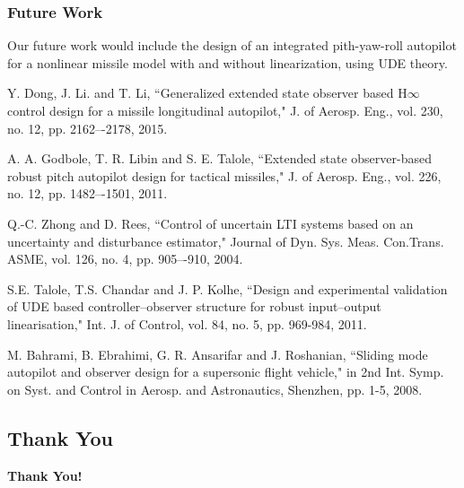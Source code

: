 \documentclass[table,10pt,red]{beamer}	%
\begin{document}
\begin{frame}
\frametitle{Future Work}
Our future work would include the design of an integrated pith-yaw-roll autopilot for a nonlinear missile model with and without linearization, using UDE theory.

\end{frame}


\begin{thebibliography}{1}

	 Y. Dong, J. Li. and T. Li, ``Generalized extended state observer based H$\infty$ control design for a missile longitudinal autopilot," J. of Aerosp. Eng., vol. 230, no. 12, pp. 2162–-2178, 2015. \label{geso}
	
	 A. A. Godbole, T. R. Libin and S. E. Talole, ``Extended state observer-based robust pitch autopilot design for tactical missiles," J. of Aerosp. Eng., vol. 226, no. 12, pp. 1482–-1501, 2011. \label{eso}
	
	  Q.-C. Zhong and D. Rees, ``Control of uncertain LTI systems based on an uncertainty and disturbance estimator," Journal of Dyn. Sys. Meas. Con.Trans. ASME, vol. 126, no. 4, pp. 905–-910, 2004. \label{ude1}
	
	 S.E. Talole, T.S. Chandar and J. P. Kolhe, ``Design and experimental validation of UDE based controller--observer structure for robust input--output linearisation," Int. J. of Control, vol. 84, no. 5, pp. 969-984, 2011. \label{talole2011}
	
	 M. Bahrami, B. Ebrahimi, G. R. Ansarifar and J. Roshanian, ``Sliding mode autopilot and observer design for a supersonic flight vehicle," in 2nd Int. Symp. on Syst. and Control in Aerosp. and Astronautics, Shenzhen, pp. 1-5, 2008.\label{bahrami}
	
\end{thebibliography}%
\subsection*{Thank You} %
\begin{frame}
\textbf{\LARGE Thank You!} \\[20pt]
\end{frame}
\end{document}
